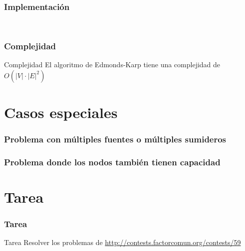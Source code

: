 \documentclass{beamer}
\begin{document}
\begin{frame}
\begin{columns}
\begin{figure}
				\end{figure}
		\end{columns}
	\end{frame}
	

	\begin{frame}
		\frametitle{Implementación}
		\begin{lstlisting}
		
		\end{lstlisting}
	\end{frame}
	
	\begin{frame}
		\frametitle{Complejidad}
		\begin{block}{Complejidad}
			El algoritmo de Edmonds-Karp tiene una complejidad de $O(|V| \cdot |E|^2)$
		\end{block}
	\end{frame}

\section{Casos especiales}
	\begin{frame}
		\frametitle{Problema con múltiples fuentes o múltiples sumideros}
	\end{frame}
	
	\begin{frame}
		\frametitle{Problema donde los nodos también tienen capacidad}
	\end{frame}

\section[]{Tarea}
	\begin{frame}[fragile]
		\frametitle{Tarea}
		\begin{alertblock}{Tarea}
			Resolver los problemas de \url{http://contests.factorcomun.org/contests/59}
		\end{alertblock}
	\end{frame}
\end{document}
